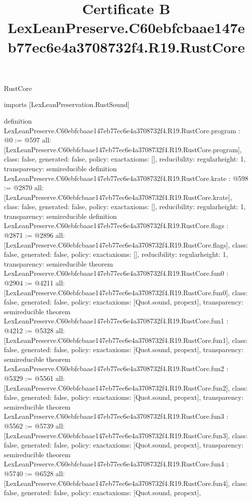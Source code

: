 \begin{lexlean}{RustCore}
\title{Certificate B LexLeanPreserve.C60ebfcbaae147eb77ec6e4a3708732f4.R19.RustCore}
\begin{coremodule}
imports [LexLeanPreservation.RustSound]

definition LexLeanPreserve.C60ebfcbaae147eb77ec6e4a3708732f4.R19.RustCore.program : @0 := @597 {
  all: [LexLeanPreserve.C60ebfcbaae147eb77ec6e4a3708732f4.R19.RustCore.program],
  class: false,
  generated: false,
  policy: exact{axioms: []},
  reducibility: regular{height: 1},
  transparency: semireducible
}
definition LexLeanPreserve.C60ebfcbaae147eb77ec6e4a3708732f4.R19.RustCore.krate : @598 := @2870 {
  all: [LexLeanPreserve.C60ebfcbaae147eb77ec6e4a3708732f4.R19.RustCore.krate],
  class: false,
  generated: false,
  policy: exact{axioms: []},
  reducibility: regular{height: 1},
  transparency: semireducible
}
definition LexLeanPreserve.C60ebfcbaae147eb77ec6e4a3708732f4.R19.RustCore.flags : @2871 := @2896 {
  all: [LexLeanPreserve.C60ebfcbaae147eb77ec6e4a3708732f4.R19.RustCore.flags],
  class: false,
  generated: false,
  policy: exact{axioms: []},
  reducibility: regular{height: 1},
  transparency: semireducible
}
theorem LexLeanPreserve.C60ebfcbaae147eb77ec6e4a3708732f4.R19.RustCore.fun0 : @2904 := @4211 {
  all: [LexLeanPreserve.C60ebfcbaae147eb77ec6e4a3708732f4.R19.RustCore.fun0],
  class: false,
  generated: false,
  policy: exact{axioms: [Quot.sound, propext]},
  transparency: semireducible
}
theorem LexLeanPreserve.C60ebfcbaae147eb77ec6e4a3708732f4.R19.RustCore.fun1 : @4212 := @5328 {
  all: [LexLeanPreserve.C60ebfcbaae147eb77ec6e4a3708732f4.R19.RustCore.fun1],
  class: false,
  generated: false,
  policy: exact{axioms: [Quot.sound, propext]},
  transparency: semireducible
}
theorem LexLeanPreserve.C60ebfcbaae147eb77ec6e4a3708732f4.R19.RustCore.fun2 : @5329 := @5561 {
  all: [LexLeanPreserve.C60ebfcbaae147eb77ec6e4a3708732f4.R19.RustCore.fun2],
  class: false,
  generated: false,
  policy: exact{axioms: [Quot.sound, propext]},
  transparency: semireducible
}
theorem LexLeanPreserve.C60ebfcbaae147eb77ec6e4a3708732f4.R19.RustCore.fun3 : @5562 := @5739 {
  all: [LexLeanPreserve.C60ebfcbaae147eb77ec6e4a3708732f4.R19.RustCore.fun3],
  class: false,
  generated: false,
  policy: exact{axioms: [Quot.sound, propext]},
  transparency: semireducible
}
theorem LexLeanPreserve.C60ebfcbaae147eb77ec6e4a3708732f4.R19.RustCore.fun4 : @5740 := @6528 {
  all: [LexLeanPreserve.C60ebfcbaae147eb77ec6e4a3708732f4.R19.RustCore.fun4],
  class: false,
  generated: false,
  policy: exact{axioms: [Quot.sound, propext]},
}
\end{coremodule}
\end{lexlean}
